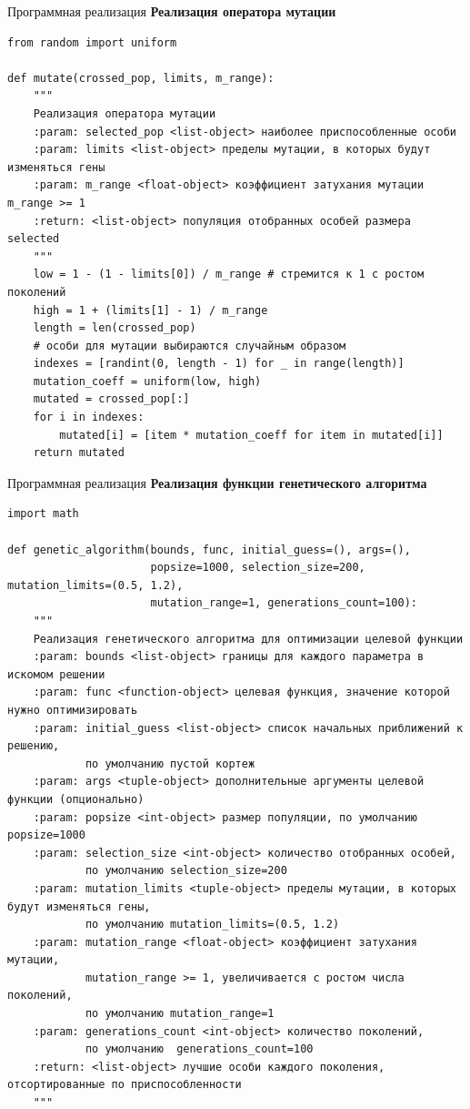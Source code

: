 \documentclass[aspectratio=169, mathserif]{beamer}	%
\begin{document}
\begin{frame}[fragile]{Программная реализация}
\scriptsize
\alert{\textbf{Реализация оператора мутации}}
\begin{verbatim}
from random import uniform

def mutate(crossed_pop, limits, m_range):
    """
    Реализация оператора мутации
    :param: selected_pop <list-object> наиболее приспособленные особи
    :param: limits <list-object> пределы мутации, в которых будут изменяться гены
    :param: m_range <float-object> коэффициент затухания мутации m_range >= 1
    :return: <list-object> популяция отобранных особей размера selected
    """
    low = 1 - (1 - limits[0]) / m_range # стремится к 1 с ростом поколений
    high = 1 + (limits[1] - 1) / m_range
    length = len(crossed_pop)
    # особи для мутации выбираются случайным образом
    indexes = [randint(0, length - 1) for _ in range(length)]
    mutation_coeff = uniform(low, high)
    mutated = crossed_pop[:]
    for i in indexes:
        mutated[i] = [item * mutation_coeff for item in mutated[i]]
    return mutated
\end{verbatim}
\vfill
\end{frame}


\begin{frame}[fragile]{Программная реализация}
\scriptsize
\alert{\textbf{Реализация функции генетического алгоритма}}
\begin{verbatim}
import math

def genetic_algorithm(bounds, func, initial_guess=(), args=(),
                      popsize=1000, selection_size=200, mutation_limits=(0.5, 1.2),
                      mutation_range=1, generations_count=100):
    """
    Реализация генетического алгоритма для оптимизации целевой функции
    :param: bounds <list-object> границы для каждого параметра в искомом решении
    :param: func <function-object> целевая функция, значение которой нужно оптимизировать
    :param: initial_guess <list-object> список начальных приближений к решению,
            по умолчанию пустой кортеж
    :param: args <tuple-object> дополнительные аргументы целевой функции (опционально)
    :param: popsize <int-object> размер популяции, по умолчанию popsize=1000
    :param: selection_size <int-object> количество отобранных особей,
            по умолчанию selection_size=200
    :param: mutation_limits <tuple-object> пределы мутации, в которых будут изменяться гены,
            по умолчанию mutation_limits=(0.5, 1.2)
    :param: mutation_range <float-object> коэффициент затухания мутации,
            mutation_range >= 1, увеличивается с ростом числа поколений,
            по умолчанию mutation_range=1
    :param: generations_count <int-object> количество поколений,
            по умолчанию  generations_count=100
    :return: <list-object> лучшие особи каждого поколения, отсортированные по приспособленности
    """
\end{verbatim}
\vfill
\end{frame}
\end{document}
